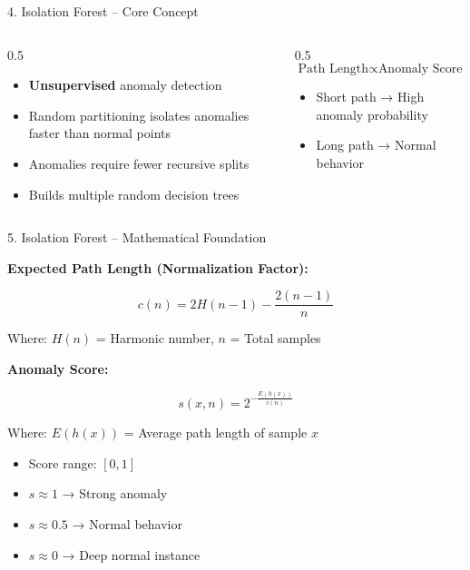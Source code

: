 \documentclass[aspectratio=169]{beamer}
\begin{document}
\begin{frame}{4. Isolation Forest – Core Concept}

\begin{columns}[T]

\begin{column}{0.5\textwidth}
\begin{itemize}
    \item \textbf{Unsupervised} anomaly detection
    \item Random partitioning isolates anomalies faster than normal points
    \item Anomalies require fewer recursive splits
    \item Builds multiple random decision trees
\end{itemize}
\end{column}

\begin{column}{0.5\textwidth}
\[
\text{Path Length} \propto \text{Anomaly Score}
\]

\vspace{0.5cm}
\begin{itemize}
    \item Short path → High anomaly probability
    \item Long path → Normal behavior
\end{itemize}
\end{column}

\end{columns}

\end{frame}

\begin{frame}{5. Isolation Forest – Mathematical Foundation}

\textbf{Expected Path Length (Normalization Factor):}

\[
c(n) = 2H(n-1) - \frac{2(n-1)}{n}
\]

{\small Where: $H(n)$ = Harmonic number, $n$ = Total samples}

\vspace{0.5cm}

\textbf{Anomaly Score:}

\[
s(x,n) = 2^{-\frac{E(h(x))}{c(n)}}
\]

{\small Where: $E(h(x))$ = Average path length of sample $x$}

\vspace{0.5cm}

\begin{itemize}
    \item Score range: $[0, 1]$
    \item $s \approx 1$ → Strong anomaly
    \item $s \approx 0.5$ → Normal behavior
    \item $s \approx 0$ → Deep normal instance
\end{itemize}

\end{frame}
\end{document}
